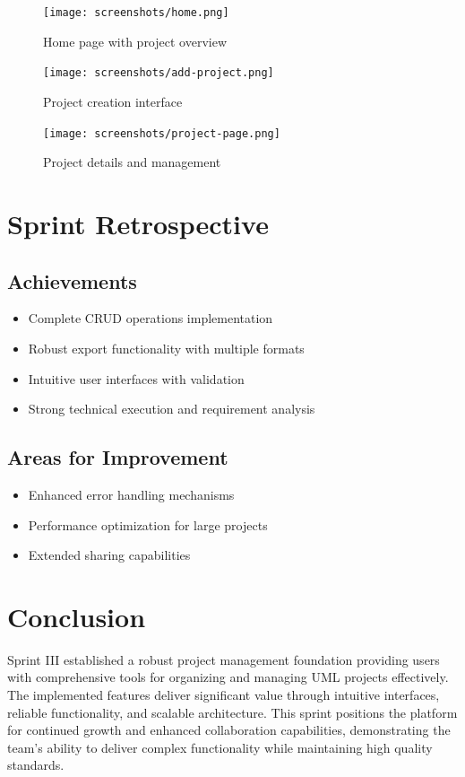 \begin{figure}[H]
\centering
\texttt{[image: screenshots/home.png]}
\caption{Home page with project overview}
\label{fig:home_page}
\end{figure}

\begin{figure}[H]
\centering
\texttt{[image: screenshots/add-project.png]}
\caption{Project creation interface}
\label{fig:add_project}
\end{figure}

\begin{figure}[H]
\centering
\texttt{[image: screenshots/project-page.png]}
\caption{Project details and management}
\label{fig:project_page}
\end{figure}


\section{Sprint Retrospective}

\subsection{Achievements}
\begin{itemize}
    \item Complete CRUD operations implementation
    \item Robust export functionality with multiple formats
    \item Intuitive user interfaces with validation
    \item Strong technical execution and requirement analysis
\end{itemize}

\subsection{Areas for Improvement}
\begin{itemize}
    \item Enhanced error handling mechanisms
    \item Performance optimization for large projects
    \item Extended sharing capabilities
\end{itemize}

\section{Conclusion}

Sprint III established a robust project management foundation providing users with comprehensive tools for organizing and managing UML projects effectively. The implemented features deliver significant value through intuitive interfaces, reliable functionality, and scalable architecture. This sprint positions the platform for continued growth and enhanced collaboration capabilities, demonstrating the team's ability to deliver complex functionality while maintaining high quality standards.